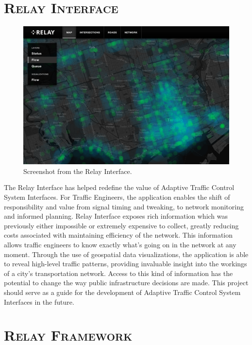 \documentclass[a4paper,10pt]{article}
\begin{document}
\begin{multicols}{2}
\section{\textsc{Relay Interface}}

\begin{figure}[H]
  \begin{centering}
    \includegraphics[scale=0.45]{figures/flow-2.png}
    \caption{Screenshot from the Relay Interface.}
    \label{fig:interface}
  \end{centering}
\end{figure}

The Relay Interface has helped redefine the value of Adaptive Traffic Control System Interfaces. For Traffic Engineers, the application enables the shift of responsibility and value from signal timing and tweaking, to network monitoring and informed planning. Relay Interface exposes rich information which was previously either impossible or extremely expensive to collect, greatly reducing costs associated with maintaining efficiency of the network. This information allows traffic engineers to know exactly what's going on in the network at any moment. Through the use of geospatial data visualizations, the application is able to reveal high-level traffic patterns, providing invaluable insight into the workings of a city's transportation network. Access to this kind of information has the potential to change the way public infrastructure decisions are made. This project should serve as a guide for the development of Adaptive Traffic Control System Interfaces in the future.

\section{\textsc{Relay Framework}}


\end{multicols}
\end{document}
